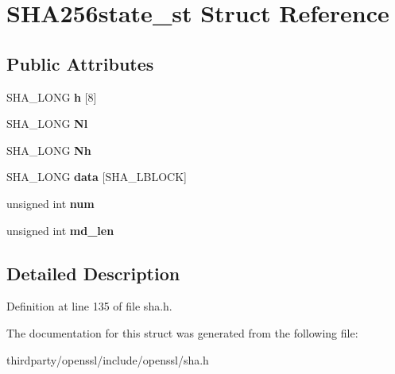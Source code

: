 \hypertarget{struct_s_h_a256state__st}{}\section{S\+H\+A256state\+\_\+st Struct Reference}
\label{struct_s_h_a256state__st}
\subsection*{Public Attributes}
\begin{DoxyCompactItemize}
\item 
\mbox{\label{struct_s_h_a256state__st_a8a5e81981080254a7aa9ad6e11a4f253}} 
S\+H\+A\+\_\+\+L\+O\+NG {\bfseries h} \mbox{[}8\mbox{]}
\item 
\mbox{\label{struct_s_h_a256state__st_ac34962074aa1766470fae99d0e2aef9b}} 
S\+H\+A\+\_\+\+L\+O\+NG {\bfseries Nl}
\item 
\mbox{\label{struct_s_h_a256state__st_a02ad38687202dc1f21f78925599ec5ca}} 
S\+H\+A\+\_\+\+L\+O\+NG {\bfseries Nh}
\item 
\mbox{\label{struct_s_h_a256state__st_a1db17688ebaf2204d126f9232d00d5da}} 
S\+H\+A\+\_\+\+L\+O\+NG {\bfseries data} \mbox{[}S\+H\+A\+\_\+\+L\+B\+L\+O\+CK\mbox{]}
\item 
\mbox{\label{struct_s_h_a256state__st_a64f6a539f36e85e82781026b68c968cf}} 
unsigned int {\bfseries num}
\item 
\mbox{\label{struct_s_h_a256state__st_a8156b1d2d8afc2bd0f0875a943b9f36a}} 
unsigned int {\bfseries md\+\_\+len}
\end{DoxyCompactItemize}


\subsection{Detailed Description}


Definition at line 135 of file sha.\+h.



The documentation for this struct was generated from the following file\+:\begin{DoxyCompactItemize}
\item 
thirdparty/openssl/include/openssl/sha.\+h\end{DoxyCompactItemize}
